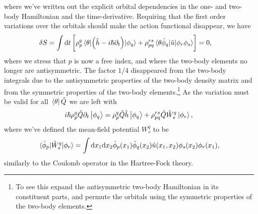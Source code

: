             where we've written out the explicit orbital dependencies in the
            one- and two-body Hamiltonian and the time-derivative.
            Requiring that the first order variations over the orbitals should
            make the action functional disappear, we have
            \begin{align}
                \delta S
                &=
                \int\dd t \left[ 
                    \rho^{q}_{p}
                    \mel*{\theta}{
                        \left( 
                            \hat{h}
                            - i\hslash\partial_t
                         \right)
                    }{\phi_q}
                    +
                    \rho^{rs}_{pq}
                    \mel*{\theta\tilde{\phi}_q}{
                        \hat{u}
                    }{\phi_r\phi_s}
                 \right]
                = 0,
            \end{align}
            where we stress that $p$ is now a free index, and where the two-body
            elements no longer are antisymmetric.
            The factor $1/4$ disappeared from the two-body integrals due to the
            antisymmetric properties of the two-body density matrix and from the
            symmetric properties of the two-body elements.\footnote{%
                To see this expand the antisymmetric two-body Hamiltonian in its
                constituent parts, and permute the orbitals using the symmetric
                properties of the two-body elements.
            }
            As the variation must be valid for all $\bra*{\theta}\hat{Q}$ we are
            left with
            \begin{align}
                i\hslash\rho^{q}_{p}\hat{Q}\partial_t\ket{\phi_q}
                = \rho^{q}_{p}\hat{Q}\hat{h}\ket{\phi_q}
                + \rho^{rs}_{pq}\hat{Q}\hat{W}^{q}_{s}\ket{\phi_{r}},
                \label{eq:ket-q}
            \end{align}
            where we've defined the mean-field potential $W^{q}_{s}$ to be
            \cite{kvaal2012ab}
            \begin{align}
                \mel*{\tilde{\phi}_p}{
                    \hat{W}^{q}_{s}
                }{\phi_r}
                = \int\dd x_1 \dd x_2
                \tilde{\phi}_{p}(x_1)
                \tilde{\phi}_{q}(x_2)
                \hat{u}(x_1, x_2)
                \phi_s(x_2)
                \phi_r(x_1),
            \end{align}
            similarly to the Coulomb operator in the Hartree-Fock theory.
